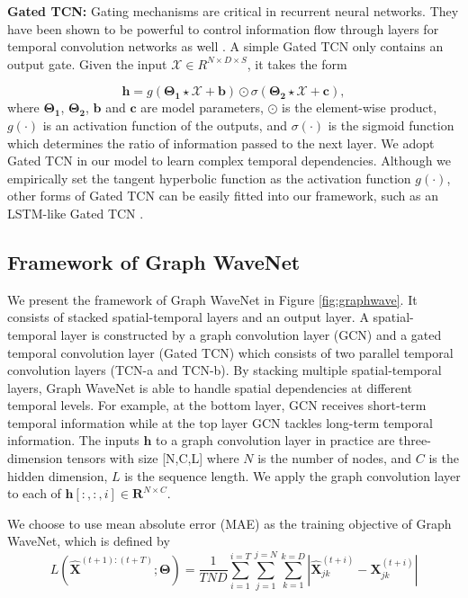 \noindent\textbf{Gated TCN:}
Gating mechanisms are critical in recurrent neural networks. They have been shown to be powerful to control information flow through layers for temporal convolution networks as well \cite{dauphin2017language}. A simple Gated TCN only contains an output gate. Given the input $\mathbf{\mathcal{X}}\in R^{N\times D\times S}$, it takes the form 

\begin{equation}
    \mathbf{h} = g(\mathbf{\Theta_1}\star\mathbf{\mathcal{X}}+\mathbf{b})\odot\sigma(\mathbf{\Theta_2}\star\mathbf{\mathcal{X}}+\mathbf{c}),
\end{equation}
where $\mathbf{\Theta_1}$, $\mathbf{\Theta_2}$, $\mathbf{b}$ and $\mathbf{c}$ are model parameters, $\odot$ is the element-wise product, $g(\cdot)$ is an activation function of the outputs, and $\sigma(\cdot)$ is the sigmoid function which determines the ratio of information passed to the next layer. We adopt Gated TCN in our model to learn complex temporal dependencies.  Although we empirically set the tangent hyperbolic function as the activation function $g(\cdot)$, other forms of Gated TCN can be easily fitted into our framework, such as an LSTM-like Gated TCN \cite{kalchbrenner2016neural}.




\subsection{Framework of Graph WaveNet}
We present the framework of Graph WaveNet in Figure \ref{fig:graphwave}. It consists of stacked spatial-temporal layers and an output layer. A spatial-temporal layer is constructed by a graph convolution layer (GCN) and a gated temporal convolution layer (Gated TCN) which consists of two parallel temporal convolution layers (TCN-a and TCN-b). By stacking multiple spatial-temporal layers, Graph WaveNet is able to handle spatial dependencies at different temporal levels. For example, at the bottom layer, GCN receives short-term temporal information while at the top layer GCN tackles long-term temporal information. The inputs $\mathbf{h}$ to a graph convolution layer in practice are three-dimension tensors with size [N,C,L] where $N$ is the number of nodes, and $C$ is the hidden dimension, $L$ is the sequence length. We apply the graph convolution layer to each of $\mathbf{h}[:,:,i] \in \mathbf{R}^{N\times C}$. 

We choose to use mean absolute error (MAE) as the training objective of Graph WaveNet, which is defined by
\begin{equation}
   L( \mathbf{\hat{X}}^{(t+1):(t+T)};\mathbf{\Theta}) = \frac{1}{TND}\sum_{i=1}^{i=T}\sum_{j=1}^{j=N}\sum_{k=1}^{k=D}|\mathbf{\hat{X}}^{(t+i)}_{jk}-\mathbf{X}^{(t+i)}_{jk}|
\end{equation}

